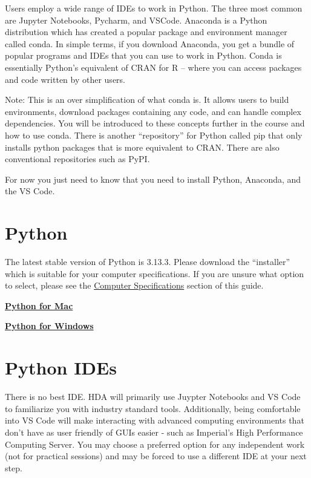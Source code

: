 \documentclass[
]{book}
\begin{document}
Users employ a wide range of IDEs to work in Python. The three most common are Jupyter Notebooks, Pycharm, and VSCode. Anaconda is a Python distribution which has created a popular package and environment manager called conda. In simple terms, if you download Anaconda, you get a bundle of popular programs and IDEs that you can use to work in Python. Conda is essentially Python's equivalent of CRAN for R -- where you can access packages and code written by other users.

Note: This is an over simplification of what conda is. It allows users to build environments, download packages containing any code, and can handle complex dependencies. You will be introduced to these concepts further in the course and how to use conda. There is another ``repository'' for Python called pip that only installs python packages that is more equivalent to CRAN. There are also conventional repositories such as PyPI.

For now you just need to know that you need to install Python, Anaconda, and the VS Code.

\section{Python}\label{installing-python}

The latest stable version of Python is 3.13.3. Please download the ``installer'' which is suitable for your computer specifications. If you are unsure what option to select, please see the \hyperref[Computer-Specifications]{Computer Specifications} section of this guide.

\textbf{\href{https://www.python.org/downloads/macos/}{Python for Mac}}

\textbf{\href{https://www.python.org/downloads/windows/}{Python for Windows}}

\section{Python IDEs}\label{installing-python-ides}

There is no best IDE. HDA will primarily use Juypter Notebooks and VS Code to familiarize you with industry standard tools. Additionally, being comfortable into VS Code will make interacting with advanced computing environments that don't have as user friendly of GUIs easier - such as Imperial's High Performance Computing Server. You may choose a preferred option for any independent work (not for practical sessions) and may be forced to use a different IDE at your next step.
\end{document}
